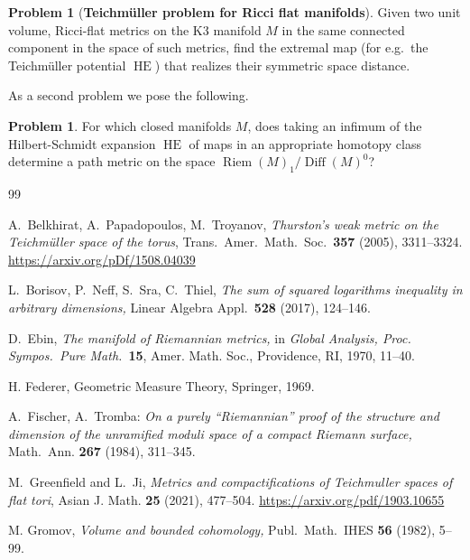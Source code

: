 \documentclass[11pt,letterpaper]{amsart}
\theoremstyle{definition}
\newtheorem{problem}[theorem]{Problem}
\numberwithin{equation}{section}
\theoremstyle{definition}
\DeclareMathOperator{\Riem}{Riem}
\DeclareMathOperator{\Diff}{Diff}
\DeclareMathOperator{\HE}{HE}
\begin{document}
\begin{problem}[{\bf Teichm\"uller problem for Ricci flat manifolds}]
Given two unit volume, Ricci-flat metrics on the K3 manifold $M$ in the same connected component  
in the space of such metrics, find the extremal map  (for e.g.\ the Teichm\"uller potential $\HE$) that realizes their symmetric space distance.
\end{problem}

As a second problem we pose the following.
\begin{problem}
For which closed manifolds $M$, does taking an infimum of the Hilbert-Schmidt expansion 
$\HE$ of maps in an appropriate homotopy class determine a path metric on the space $\Riem (M)_{1}/\Diff(M)^0$?
\end{problem}
\begin{thebibliography}{99} 


A.~Belkhirat, A.~Papadopoulos, M.~Troyanov,
\textit{Thurston's weak metric on the Teichm\" uller space of the torus},
Trans.\ Amer.\ Math.\ Soc.\ \textbf{357} (2005), 3311--3324. \url{https://arxiv.org/pDf/1508.04039}

L.~Borisov, P.~Neff, S.~Sra, C.~Thiel,
\textit{The sum of squared logarithms inequality in arbitrary dimensions,}
Linear Algebra Appl.\  \textbf{528} (2017), 124--146.

D.~Ebin,
\textit{The manifold of Riemannian metrics,} in \textsl{Global Analysis, Proc. Sympos.\ Pure Math.}\ \textbf{15}, Amer. Math. Soc., Providence, RI, 1970, 11--40.


H. Federer, Geometric Measure Theory, Springer, 1969. 

A.~Fischer, A.~Tromba:
\textit{On a purely ``Riemannian'' proof of the structure and dimension of the unramified moduli space of a compact Riemann surface,} Math.\ Ann.  \textbf{267} (1984), 311--345.

M.~Greenfield and L.~Ji,
\emph{Metrics and compactifications of Teichmuller spaces of flat tori},
Asian J. Math. \textbf{25} (2021), 477--504. \url{https://arxiv.org/pdf/1903.10655}

M. Gromov, 
\textit{Volume and bounded cohomology,}
Publ.\ Math.\ IHES \textbf{56} (1982), 5--99.


\end{thebibliography}
\end{document}
